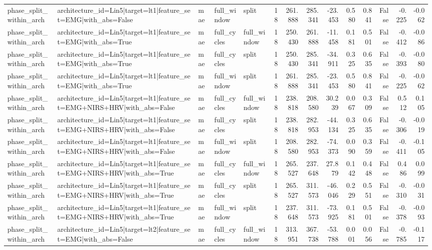 \begin{table}
\begin{tabular}{lllllrrrrrrrrr}
phase_split_within_arch & architecture_id=Lin5|target=lt1|feature_set=EMG|with_abs=False & mae & full_window & split & 18 & 261.888 & 285.341 & -23.453 & 0.580 & 0.841 & False & -0.225 & -0.062 \\
phase_split_within_arch & architecture_id=Lin5|target=lt1|feature_set=EMG|with_abs=True & mae & full_cycles & full_window & 18 & 250.430 & 261.888 & -11.458 & 0.181 & 0.501 & False & -0.412 & -0.086 \\
phase_split_within_arch & architecture_id=Lin5|target=lt1|feature_set=EMG|with_abs=True & mae & full_cycles & split & 18 & 250.430 & 285.341 & -34.911 & 0.325 & 0.635 & False & -0.393 & -0.080 \\
phase_split_within_arch & architecture_id=Lin5|target=lt1|feature_set=EMG|with_abs=True & mae & full_window & split & 18 & 261.888 & 285.341 & -23.453 & 0.580 & 0.841 & False & -0.225 & -0.062 \\
phase_split_within_arch & architecture_id=Lin5|target=lt1|feature_set=EMG+NIRS+HRV|with_abs=False & mae & full_cycles & full_window & 18 & 238.818 & 208.580 & 30.239 & 0.067 & 0.309 & False & 0.512 & 0.105 \\
phase_split_within_arch & architecture_id=Lin5|target=lt1|feature_set=EMG+NIRS+HRV|with_abs=False & mae & full_cycles & split & 18 & 238.818 & 282.953 & -44.134 & 0.325 & 0.635 & False & -0.306 & -0.019 \\
phase_split_within_arch & architecture_id=Lin5|target=lt1|feature_set=EMG+NIRS+HRV|with_abs=False & mae & full_window & split & 18 & 208.580 & 282.953 & -74.373 & 0.090 & 0.359 & False & -0.411 & -0.105 \\
phase_split_within_arch & architecture_id=Lin5|target=lt1|feature_set=EMG+NIRS+HRV|with_abs=True & mae & full_cycles & full_window & 18 & 265.527 & 237.648 & 27.879 & 0.142 & 0.448 & False & 0.486 & 0.099 \\
phase_split_within_arch & architecture_id=Lin5|target=lt1|feature_set=EMG+NIRS+HRV|with_abs=True & mae & full_cycles & split & 18 & 265.527 & 311.573 & -46.046 & 0.229 & 0.551 & False & -0.310 & -0.031 \\
phase_split_within_arch & architecture_id=Lin5|target=lt1|feature_set=EMG+NIRS+HRV|with_abs=True & mae & full_window & split & 18 & 237.648 & 311.573 & -73.925 & 0.181 & 0.501 & False & -0.378 & -0.093 \\
phase_split_within_arch & architecture_id=Lin5|target=lt2|feature_set=EMG|with_abs=False & mae & full_cycles & full_window & 18 & 313.951 & 367.738 & -53.788 & 0.001 & 0.056 & False & -0.785 & -0.117 \\

\end{tabular}
\end{table}

